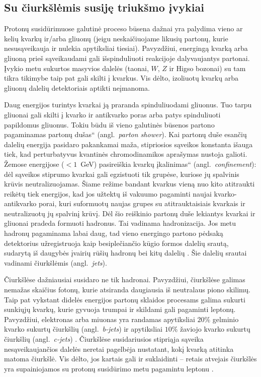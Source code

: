 \documentclass[a4paper, 12pt, oneside]{article}
\newcommand{\ltq}[1]{{\quotedblbase{}#1\textquotedblleft{}}}
\newlength\q
\begin{document}
\subsection{Su čiurkšlėmis susiję triukšmo įvykiai}\label{sec:jets}
Protonų susidūrimuose galutinė proceso būsena dažnai yra palydima vieno ar kelių kvarkų ir/arba gliuonų
(jeigu neskaičiuojame likusių partonų, kurie nesusąveikauja ir nulekia apytiksliai tiesiai).
Pavyzdžiui, energingą kvarką arba gliuoną prieš sąveikaudami gali išspinduliuoti reakcijoje dalyvaujantys partonai.
Įvykio metu sukurtos masyvios dalelės (taonai, $W$, $Z$ ir Higso bozonai) su tam tikra tikimybe taip pat gali skilti į kvarkus.
Vis dėlto, izoliuotų kvarkų arba gliuonų dalelių detektoriais aptikti neįmanoma.

Daug energijos turintys kvarkai ją praranda spinduliuodami gliuonus.
Tuo tarpu gliuonai gali skilti į kvarko ir antikvarko poras arba patys spinduliuoti papildomus gliuonus.
Tokiu būdu iš vieno galutinės būsenos partono pagaminamas \ltq{partonų dušas} (angl.\ \textit{parton shower}).
Kai partonų duše esančių dalelių energija pasidaro pakankamai maža, stipriosios sąveikos konstanta išauga
tiek, kad perturbatyvus kvantinės chromodinamikos aprašymas nustoja galioti.
Žemose energijose ($<\!1$~GeV) pasireiškia kvarkų \ltq{įkalinimas} (angl.\ \textit{confinement}): dėl sąveikos stiprumo
kvarkai gali egzistuoti tik grupėse, kuriose jų spalvinis krūvis neutralizuojamas.
Šiame režime bandant kvarkus vieną nuo kito atitraukti reikėtų tiek energijos, kad jos užtektų iš vakuumo pagaminti
naujai kvarko-antikvarko porai, kuri suformuotų naujas grupes su atitrauktaisiais kvarkais ir neutralizuotų jų spalvinį krūvį.
Dėl šio reiškinio partonų duše lekiantys kvarkai ir gliuonai pradeda formuoti hadronus.
Tai vadinama hadronizacija.
Jos metu hadronų pagaminama labai daug, tad vieno energingo partono pėdsaką detektorius užregistruoja kaip besiplečiančio
kūgio formos dalelių srautą, sudarytą iš daugybės įvairių rūšių hadronų bei kitų dalelių \cite{Jets}.
Šie dalelių srautai vadinami čiurkšlėmis (angl.\ \textit{jets}).

Čiurkšlėse dažniausiai susidaro ne tik hadronai.
Pavyzdžiui, čiurkšlėse galimas nemažas skaičius fotonų, kurie atsiranda daugiausia iš neutralaus piono skilimų.
Taip pat vykstant didelės energijos partonų sklaidos procesams galima sukurti sunkiųjų kvarkų, kurie gyvuoja trumpai
ir skildami gali pagaminti leptonų.
Pavyzdžiui, elektronas arba miuonas yra randamas apytiksliai $20\%$ gelminio kvarko sukurtų čiurkšlių
(angl.\ \textit{b-jets}) ir apytiksliai $10\%$ žaviojo kvarko sukurtų čiurkšlių (angl.\ \textit{c-jets}) \cite{LeptonJets}.
Čiurkšlėse susidariusios stipriąja sąveika nesąveikaujančios dalelės neretai pagelbėja nustatant,
kokį kvarką atitinka matoma čiurkšlė.
Vis dėlto, jos kartais gali ir suklaidinti -- retais atvejais čiurkšlės yra supainiojamos su protonų susidūrimo metu
pagamintu leptonu
\cite{DY_CMS2011, DY_CMS2013, DY_ATLAS2013, DY_ATLAS2014, DY_CMS2015, DY_ATLAS2016, DY_ATLAS2017, DY_CMS2019, EleID, MuonID}.
\end{document}
